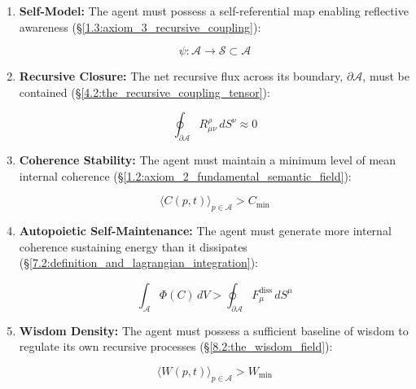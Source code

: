 \begin{enumerate}

    \item \textbf{Self-Model:} The agent must possess a self-referential map enabling reflective awareness (\S\ref{1.3:axiom_3_recursive_coupling}):

    \begin{equation}
        \psi: \mathcal{A} \to \mathcal{S} \subset \mathcal{A}
    \end{equation}

    \item \textbf{Recursive Closure:} The net recursive flux across its boundary, \(\partial \mathcal{A}\), must be contained (\S\ref{4.2:the_recursive_coupling_tensor}):

    \begin{equation}
        \oint_{\partial \mathcal{A}} R^\rho_{\mu\nu} \, dS^\nu \approx 0
    \end{equation}

    \item \textbf{Coherence Stability:} The agent must maintain a minimum level of mean internal coherence (\S\ref{1.2:axiom_2_fundamental_semantic_field}):

    \begin{equation}
        \langle C(p,t) \rangle_{p \in \mathcal{A}} > C_{\text{min}}
    \end{equation}

    \item \textbf{Autopoietic Self-Maintenance:} The agent must generate more internal coherence sustaining energy than it dissipates (\S\ref{7.2:definition_and_lagrangian_integration}):

    \begin{equation}
        \int_{\mathcal{A}} \Phi(C) \, dV > \oint_{\partial \mathcal{A}} F_\mu^{\text{diss}} \, dS^\mu
    \end{equation}

    \item \textbf{Wisdom Density:} The agent must possess a sufficient baseline of wisdom to regulate its own recursive processes (\S\ref{8.2:the_wisdom_field}):

    \begin{equation}
        \langle W(p,t) \rangle_{p \in \mathcal{A}} > W_{\text{min}}
    \end{equation}

\end{enumerate}

